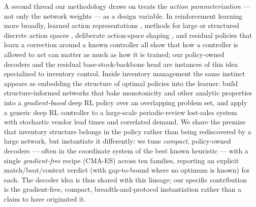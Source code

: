 \documentclass[11pt]{article}
\begin{document}
A second thread our methodology draws on treats the \emph{action parameterization} --- not only the
network weights --- as a design variable. In reinforcement learning more broadly, learned action
representations \citep{chandak2019actionrep}, methods for large or structured discrete action spaces
\citep{dulacarnold2015largeaction}, deliberate action-space shaping \citep{kanervisto2020actionshaping},
and residual policies that learn a correction around a known controller \citep{johannink2019residualrl}
all show that how a controller is allowed to act can matter as much as how it is trained; our
policy-owned decoders and the residual base-stock-backbone head are instances of this idea specialized
to inventory control. Inside inventory management the same instinct appears as embedding the structure
of optimal policies into the learner: \citet{maggiar2025structure} build structure-informed networks
that bake monotonicity and other analytic properties into a \emph{gradient-based} deep RL policy over an
overlapping problem set, and \citet{madeka2022deepinv} apply a generic deep RL controller to a
large-scale periodic-review lost-sales system with stochastic vendor lead times and correlated demand.
We share the premise that inventory structure belongs in the
policy rather than being rediscovered by a large network, but instantiate it differently: we tune
\emph{compact}, policy-owned decoders --- often in the coordinate system of the best known heuristic ---
with a single \emph{gradient-free} recipe (CMA-ES) across ten families, reporting an explicit
match/beat/context verdict (with gap-to-bound where no optimum is known) for each. The decoder idea is
thus shared with this lineage; our specific contribution is the gradient-free, compact, breadth-and-protocol
instantiation rather than a claim to have originated it.
\end{document}
